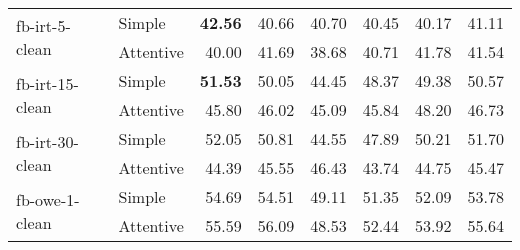 \begin{tabular}{| l | l | r | r | r | r | r | r |}
    \multirow{2}{*}{fb-irt-5-clean}
    & Simple    & \textbf{42.56} & 40.66          & 40.70 & 40.45 & 40.17 & 41.11          \\
    & Attentive & 40.00          & 41.69          & 38.68 & 40.71 & 41.78 & 41.54          \\ \hline

    \multirow{2}{*}{fb-irt-15-clean}
    & Simple    & \textbf{51.53} & 50.05          & 44.45 & 48.37 & 49.38 & 50.57          \\
    & Attentive & 45.80          & 46.02          & 45.09 & 45.84 & 48.20 & 46.73          \\ \hline

    \multirow{2}{*}{fb-irt-30-clean}
    & Simple    & 52.05          & 50.81          & 44.55 & 47.89 & 50.21 & 51.70          \\
    & Attentive & 44.39          & 45.55          & 46.43 & 43.74 & 44.75 & 45.47          \\ \hline

    \multirow{2}{*}{fb-owe-1-clean}
    & Simple    & 54.69          & 54.51          & 49.11 & 51.35 & 52.09 & 53.78          \\
    & Attentive & 55.59          & 56.09          & 48.53 & 52.44 & 53.92 & 55.64          \\ \hline

\end{tabular}
